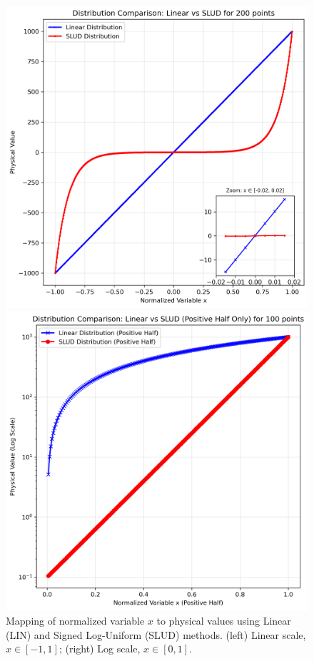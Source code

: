 \documentclass[10pt,fleqn,a4paper,twoside]{article}
\begin{document}
\begin{figure}[h!]
    \centering
    \begin{minipage}{0.48\textwidth}
        \centering
        \includegraphics[width=\textwidth]{dists_example.png}
    \end{minipage}\hfill
    \begin{minipage}{0.48\textwidth}
        \centering
        \includegraphics[width=\textwidth]{dists_example_semilogy.png}
    \end{minipage}
    \caption{Mapping of normalized variable $x$ to physical values using Linear (LIN) and Signed Log-Uniform (SLUD) methods. (left) Linear scale, $x \in [-1, 1]$; (right) Log scale, $x \in [0, 1]$.}
    \label{Fig:dists_comparison}
\end{figure}
\end{document}
